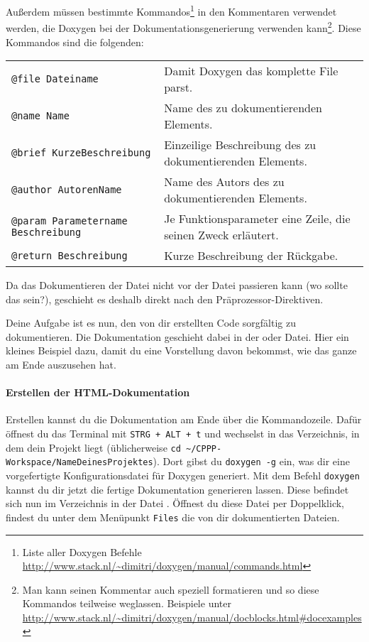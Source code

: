 Außerdem müssen bestimmte Kommandos\footnote{Liste aller Doxygen Befehle \url{http://www.stack.nl/~dimitri/doxygen/manual/commands.html}} in den Kommentaren verwendet werden, die Doxygen bei der Dokumentationsgenerierung verwenden kann\footnote{Man kann seinen Kommentar auch speziell formatieren und so diese Kommandos teilweise weglassen.
Beispiele unter \url{http://www.stack.nl/~dimitri/doxygen/manual/docblocks.html\#docexamples}}.
Diese Kommandos sind die folgenden:

\medskip
    \begin{tabular}{ll}
        {\lstinline!@file Dateiname!} & Damit Doxygen das komplette File parst. \\
        {\lstinline!@name Name!} & Name des zu dokumentierenden Elements. \\
        {\lstinline!@brief KurzeBeschreibung!} & Einzeilige Beschreibung des zu dokumentierenden Elements. \\
        {\lstinline!@author AutorenName!} & Name des Autors des zu dokumentierenden Elements. \\
        {\lstinline!@param Parametername Beschreibung!} & Je Funktionsparameter eine Zeile, die seinen Zweck erläutert. \\
        {\lstinline!@return Beschreibung!} & Kurze Beschreibung der Rückgabe. \\
    \end{tabular}
\medskip

Da das Dokumentieren der Datei nicht vor der Datei passieren kann (wo sollte das sein?), geschieht es deshalb direkt nach den Präprozessor-Direktiven.

Deine Aufgabe ist es nun, den von dir erstellten Code sorgfältig zu dokumentieren.
Die Dokumentation geschieht dabei in der  oder  Datei. 
Hier ein kleines Beispiel dazu, damit du eine Vorstellung davon bekommst, wie das ganze am Ende auszusehen hat.


\paragraph{Erstellen der HTML-Dokumentation}
Erstellen kannst du die Dokumentation am Ende über die Kommandozeile.
Dafür öffnest du das Terminal mit \lstinline{STRG + ALT + t} und wechselst in das Verzeichnis, in dem dein Projekt liegt (üblicherweise \lstinline{cd ~/CPPP-Workspace/NameDeinesProjektes}).
Dort gibst du \lstinline{doxygen -g} ein, was dir eine vorgefertigte Konfigurationsdatei für Doxygen generiert. 
Mit dem Befehl \lstinline{doxygen} kannst du dir jetzt die fertige Dokumentation generieren lassen.
Diese befindet sich nun im Verzeichnis  in der Datei .
Öffnest du diese Datei per Doppelklick, findest du unter dem Menüpunkt \lstinline{Files} die von dir dokumentierten Dateien.

